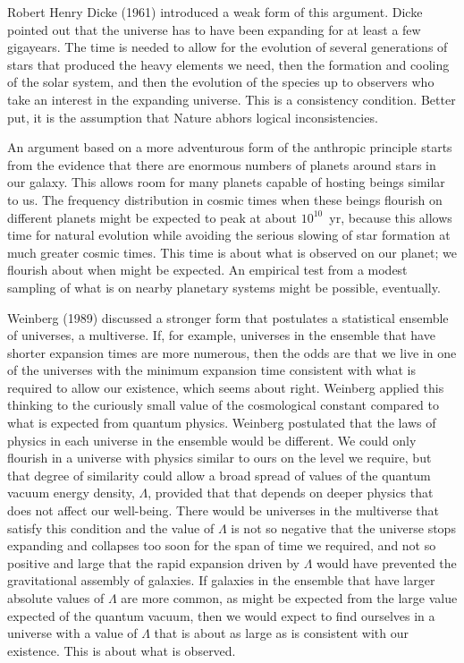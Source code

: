 \documentclass[fleqn,12pt]{article}
\begin{document}
Robert Henry Dicke (1961) introduced a weak form of this argument. Dicke pointed out that  the universe has to have been expanding for at least a few gigayears. The time is needed to allow for the evolution of several generations of stars that produced the heavy elements we need, then the formation and cooling of the solar system, and then the evolution of the species up to observers who take an interest in the expanding universe. This is a consistency condition. Better put, it is the assumption that Nature abhors logical inconsistencies. 

An argument based on a more adventurous form of the anthropic principle starts from the evidence that there are enormous numbers of planets around stars in our galaxy. This allows room for many planets capable of hosting beings similar to us. The frequency distribution in cosmic times when these beings flourish on different planets might be expected to peak at about $10^{10}$~yr, because this allows time for natural evolution while avoiding the serious slowing of star formation at much greater cosmic times. This time is about what is observed on our planet; we flourish about when might be expected. An empirical test from a modest sampling of what is on nearby planetary systems might be possible, eventually. 

 Weinberg (1989) discussed a stronger form that postulates a statistical ensemble of universes, a multiverse. If, for example, universes in the ensemble that have shorter expansion times are more numerous, then the odds are that we live in one of the universes with the minimum expansion time consistent with what is required to allow our existence, which seems about right. Weinberg applied this thinking to the curiously small value of the cosmological constant compared to what is expected from quantum physics. Weinberg postulated that the laws of physics in each universe in the ensemble would be different. We could only flourish in a universe with physics similar to ours on the level we require, but that degree of similarity could allow a broad spread of values of the quantum vacuum energy density, $\Lambda$, provided that that depends on deeper physics that does not affect our well-being. There would be universes in the multiverse that satisfy this condition and the value of $\Lambda$ is not so negative that the universe stops expanding and collapses too soon for the span of time we required, and not so positive and large that the rapid expansion driven by $\Lambda$ would have prevented the gravitational assembly of galaxies. If galaxies in the ensemble that have larger absolute values of $\Lambda$ are more common, as might be expected from the large value expected of the quantum vacuum, then we would expect to find ourselves in a universe with a value of $\Lambda$ that is about as large as is consistent with our existence. This is about what is observed. 
\end{document}
